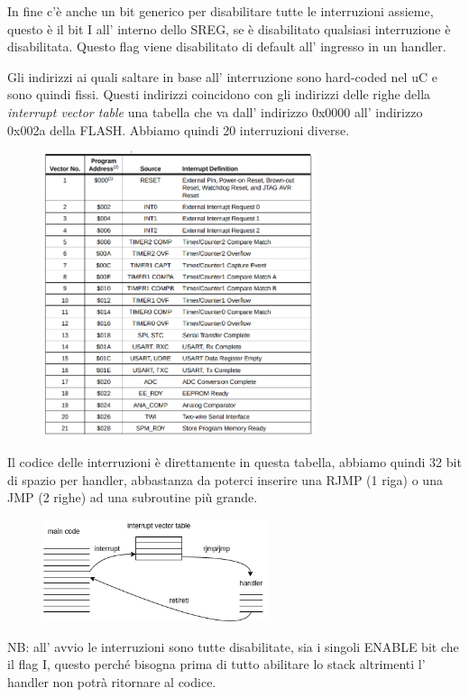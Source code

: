 In fine c'è anche un bit generico per disabilitare tutte le interruzioni assieme, questo è il bit I all' interno dello SREG, se è disabilitato qualsiasi interruzione è disabilitata.
Questo flag viene disabilitato di default all' ingresso in un handler.

Gli indirizzi ai quali saltare in base all' interruzione sono hard-coded nel uC e sono quindi fissi.
Questi indirizzi coincidono con gli indirizzi delle righe della \emph{interrupt vector table} una tabella che va dall' indirizzo 0x0000 all' indirizzo 0x002a della FLASH. Abbiamo quindi 20 interruzioni diverse.

\begin{figure}[H]
    \centering
    \includegraphics[width=300px]{images/15_Interrupt/interrupt_vector_table.png}
\end{figure}

Il codice delle interruzioni è direttamente in questa tabella, abbiamo quindi 32 bit di spazio per handler, abbastanza da poterci inserire una RJMP (1 riga) o una JMP (2 righe) ad una subroutine più grande.

\begin{figure}[H]
    \centering
    \includegraphics[width=250px]{images/15_Interrupt/interrupt_handler_with_table.png}
\end{figure}

NB: all' avvio le interruzioni sono tutte disabilitate, sia i singoli ENABLE bit che il flag I, questo perché bisogna prima di tutto abilitare lo stack altrimenti l' handler non potrà ritornare al codice.

